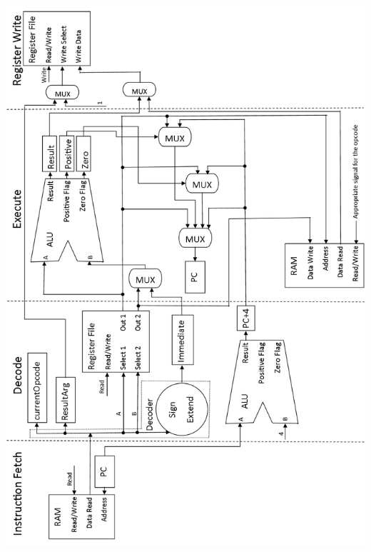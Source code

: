 \documentclass[11pt,a4paper]{IEEEtran}
\begin{document}
	\includegraphics[scale=0.80]{Datapath.png}
	
\end{document}

